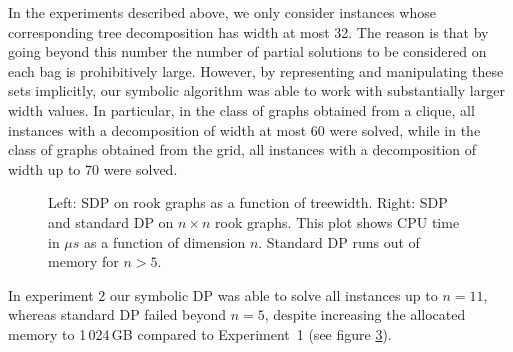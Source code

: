 In the experiments described above, we only consider instances whose corresponding tree decomposition has width at most 32. The reason is that by going beyond this number the number of partial solutions to be considered on each bag is prohibitively large. However, by representing and manipulating these sets implicitly, our symbolic algorithm was able to work with substantially larger width values. In particular, in the class of graphs obtained from a clique, all instances with a decomposition of width at most 60 were solved, while in the class of graphs obtained from the grid, all instances with a decomposition of width up to $70$ were solved. 

\begin{figure}[h]
    \begin{subfigure}{0.48\textwidth}
        \centering
         \resizebox{\textwidth}{!}{}
        \label{fig:rookbytreewidth}
    \end{subfigure}
    \hfill
    \begin{subfigure}{0.48\textwidth}       
    \centering
    \resizebox{\textwidth}{!}{}
        \label{fig:rookbysize}
    \end{subfigure}
    \caption{Left: SDP on rook graphs as a function of treewidth. Right: SDP and standard DP on $n \times n$ rook graphs. This plot shows CPU time in $\mu s$ as a function of dimension $n$. Standard DP runs out of memory for $n>5$.\label{fig:RookComparison}}
   
\end{figure}

In experiment 2 our symbolic DP was able to solve all instances
up to $n=11$, whereas standard DP failed beyond $n=5$, despite increasing the
allocated memory to 1\,024\,GB compared to Experiment~1 (see figure \ref{fig:RookComparison}). 




